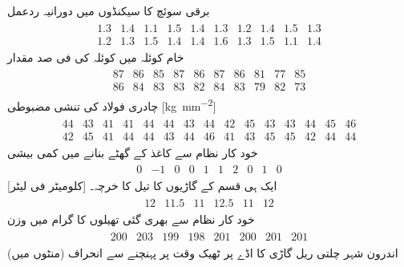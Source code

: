 \quad برقی سوئچ کا سیکنڈوں میں دورانیہ ردعمل 
\begin{align*}
\begin{array}{rrrrrrrrrr}
1.3&1.4&1.1&1.5&1.4&1.3&1.2&1.4&1.5&1.3\\
1.2&1.3&1.5&1.4&1.4&1.6&1.3&1.5&1.1&1.4
\end{array}
\end{align*}
\quad خام کوئلہ میں کوئلہ کی فی صد مقدار
\begin{align*}
\begin{array}{rrrrrrrrrr}
87&86&85&87&86&87&86&81&77&85\\
86&84&83&83&82&84&83&79&82&73
\end{array}
\end{align*}
\quad چادری فولاد کی تنشی مضبوطی [\si{\kilo\gram\per\milli\meter\squared}]
\begin{align*}
\begin{array}{rrrrrrrrrrrrrrr}
44&43&41&41&44&44&43&44&42&45&43&43&44&45&46\\
42&45&41&44&44&43&44&46&41&43&45&45&42&44&44
\end{array}
\end{align*}
\quad  خود کار نظام سے  کاغذ  کے گھٹے بنانے میں کمی بیشی
\begin{align*}
\begin{array}{rrrrrrrrrr}
0&-1&0&0&1&1&2&0&1&0
\end{array}
\end{align*}
\quad  ایک ہی قسم کے گاڑیوں کا تیل کا خرچہ۔  [کلومیٹر فی لیٹر]  
\begin{align*}
\begin{array}{rrrrrr}
12& 11.5&11&12.5&11&12
\end{array}
\end{align*}
\quad  خود کار نظام سے بھری گئی تھیلوں کا گرام میں وزن
\begin{align*}
\begin{array}{rrrrrrrr}
200&203&199&198&201&200&201&201
\end{array}
\end{align*}
\quad  اندرون شہر چلتی ریل گاڑی کا اڈے پر ٹھیک وقت پر پہنچنے سے انحراف (منٹوں میں)
